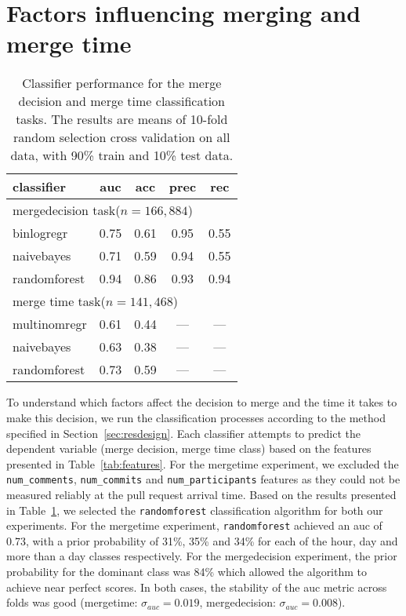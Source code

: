 \documentclass{sig-alternate}
\begin{document}
\section{Factors influencing merging and merge time}
\label{sec:accrej}

\begin{table}
  \centering
  \begin{tabular}{lcccc}
    \hline
    {\bf classifier} & {\sc auc} & {\sc acc} & {\sc prec} & {\sc rec} \\
    \hline
    \multicolumn{4}{l}{\textsf{mergedecision} task($n = 166,884$)} \\
    binlogregr    & 0.75 & 0.61 & 0.95  & 0.55 \\
    naivebayes    & 0.71 & 0.59 & 0.94 &  0.55 \\
    randomforest  & 0.94 & 0.86 & 0.93 & 0.94 \\
    \hline
    \multicolumn{4}{l}{\textsf{merge time} task($n = 141,468$)} \\
    multinomregr  & 0.61 & 0.44 & --- & --- \\
    naivebayes    & 0.63 & 0.38 & --- & ---  \\
    randomforest  & 0.73 & 0.59 & --- & ---   \\
    \hline
  \end{tabular}
  \caption{Classifier performance for the merge decision and merge time
  classification tasks. The results are means of 10-fold random selection
  cross validation on all data, with 90\% train and 10\% test data.}
  \label{tab:classif-perf}
\end{table}

To understand which factors affect the decision to merge and the time it takes to make this decision,
we run the classification processes according to the method specified in
Section~\ref{sec:resdesign}. Each classifier attempts to predict the dependent
variable (merge decision, merge time class) based on the features presented in
Table~\ref{tab:features}. For the \textsf{mergetime} experiment, we excluded the
\texttt{num\_comments}, \texttt{num\_commits} and \texttt{num\_participants}
features as they could not be measured reliably at the pull request arrival
time. Based on the results presented in Table~\ref{tab:classif-perf}, we
selected the \texttt{randomforest} classification algorithm for both our
experiments. For the \textsf{mergetime} experiment, \texttt{randomforest}
achieved an {\sc auc} of 0.73, with a prior probability of 31\%, 35\% and 34\%
for each of the \textsf{hour}, \textsf{day} and \textsf{more than a day} classes
respectively. For the \textsf{mergedecision} experiment, the prior probability
for the dominant class was 84\% which allowed the algorithm to achieve near
perfect scores. In both cases, the stability of the {\sc auc} metric across
folds was good (\textsf{mergetime}: $\sigma_{auc} = 0.019$,
\textsf{mergedecision}: $\sigma_{auc} = 0.008$).
\end{document}
